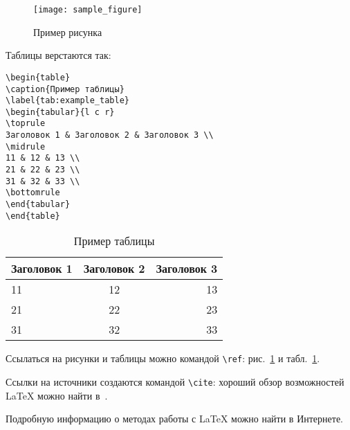 \begin{figure}
\centering
\texttt{[image: sample\_figure]}
\caption{Пример рисунка}
\label{fig:sample_figure}
\end{figure}

Таблицы верстаются так:
\begin{verbatim}
\begin{table}
\caption{Пример таблицы}
\label{tab:example_table}
\begin{tabular}{l c r}
\toprule
Заголовок 1 & Заголовок 2 & Заголовок 3 \\
\midrule
11 & 12 & 13 \\
21 & 22 & 23 \\
31 & 32 & 33 \\
\bottomrule
\end{tabular}
\end{table}
\end{verbatim}

\begin{table}
\caption{Пример таблицы}
\label{tab:example_table}
\begin{tabular}{l c r}
\toprule
Заголовок 1 & Заголовок 2 & Заголовок 3 \\
\midrule
11 & 12 & 13 \\
21 & 22 & 23 \\
31 & 32 & 33 \\
\bottomrule
\end{tabular}
\end{table}

Ссылаться на рисунки и таблицы можно командой \verb|\ref|: рис.~\ref{fig:sample_figure} и табл.~\ref{tab:example_table}.

Ссылки на источники создаются командой \verb|\cite|: хороший обзор возможностей \LaTeX{} можно найти в~\cite{oetiker1995not}.

Подробную информацию о методах работы с \LaTeX{} можно найти в Интернете.
